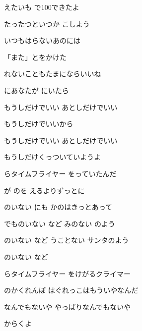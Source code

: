 \documentclass[14pt]{ltjsarticle}
\begin{document}
{  えたいも で100できたよ
  \jisho{}

  
たったつといつか こしよう
  \jisho{}

\item
  
いつもはらないあのには
  \jisho{}

  「また」とをかけた
  \jisho{}

  れないこともたまにならいいね
  \jisho{}

  にあなたが にいたら
  \jisho{}

\item
  
もうしだけでいい あとしだけでいい
  \jisho{}

  
もうしだけでいいから
  \jisho{}

  
もうしだけでいい あとしだけでいい
  \jisho{}

  
もうしだけくっついていようよ
  \jisho{}

\item
  らタイムフライヤー をっていたんだ
  \jisho{}

  が のを えるよりずっとに
  \jisho{}

\item
  のいない にも かのはきっとあって
  \jisho{}

  
でものいない など みのない のよう
  \jisho{}

  のいない など うことない サンタのよう
  \jisho{}

  のいない など
  \jisho{}

\item
  らタイムフライヤー をけがるクライマー
  \jisho{}

  のかくれんぼ はぐれっこはもういやなんだ
  \jisho{}

\item
  
なんでもないや やっぱりなんでもないや
  \jisho{}

  からくよ
  \jisho{}

}
\end{document}
